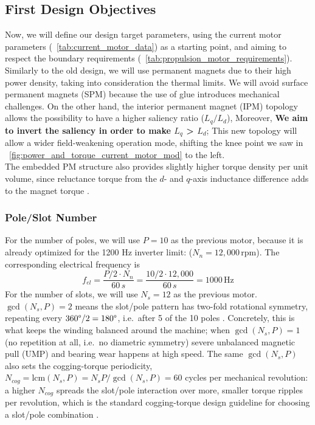 \documentclass[10pt,final,journal,a4paper,oneside,twocolumn]{IEEEtran}
\begin{document}
\subsection{First Design Objectives}
Now, we will define our design target parameters, using the current motor parameters (\tablename~\ref{tab:current_motor_data}) as a starting point, and aiming to respect the boundary requirements (\tablename~\ref{tab:propulsion_motor_requirements}).
Similarly to the old design, we will use permanent magnets due to their high power density, taking into consideration the thermal limits. We will avoid surface permanent magnets (SPM) because the use of glue introduces mechanical challenges. On the other hand, the interior permanent magnet (IPM) topology allows the possibility to have a higher saliency ratio ($L_q/L_d$), Moreover, \textbf{We aim to invert the saliency in order to make $L_q$ > $L_d$}; This new topology will allow a wider field-weakening operation mode, shifting the knee point we saw in \figurename~\ref{fig:power_and_torque_current_motor_mod} to the left. \\
The embedded PM structure also provides slightly higher torque density per unit volume, since reluctance torque from the $d$- and $q$-axis inductance difference adds to the magnet torque \cite{LeiXu2019}.

\subsubsection{Pole/Slot Number}
\label{sec:pole_slot_number}
For the number of poles, we will use $P=10$ as the previous motor, because it is already optimized for the 1200 Hz inverter limit: ($N_n = 12,000\,\text{rpm}$).
The corresponding electrical frequency is
\begin{equation}
    f_{el} = \frac{P/2\cdot N_n}{60\,s} = \frac{10/2 \cdot 12,000}{60\,s} = 1000\,\text{Hz}
\end{equation}
For the number of slots, we will use $N_s = 12$ as the previous motor. $\gcd(N_s,P)=2$ means the slot/pole pattern has two-fold rotational symmetry, repeating every $360\text{\textdegree{}}/2=180\text{\textdegree{}}$, i.e.\ after 5 of the 10 poles \cite{Lipo2017}. Concretely, this is what keeps the winding balanced around the machine; when $\gcd(N_s,P)=1$ (no repetition at all, i.e.\ no diametric symmetry) severe unbalanced magnetic pull (UMP) and bearing wear happens at high speed. The same $\gcd(N_s,P)$ also sets the cogging-torque periodicity, $N_{cog}=\mathrm{lcm}(N_s,P)=N_sP/\gcd(N_s,P)=60$ cycles per mechanical revolution: a higher $N_{cog}$ spreads the slot/pole interaction over more, smaller torque ripples per revolution, which is the standard cogging-torque design guideline for choosing a slot/pole combination \cite{ZhuHowe2000}.
\end{document}
